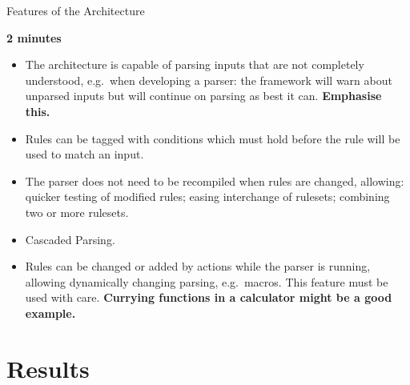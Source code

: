 \documentclass{beamer}
\newcommand{\timingnote}[1]{%
    \textbf{#1}%
}
\begin{document}
\begin{frame}{Features of the Architecture}

    \timingnote{2 minutes}

    \begin{itemize}

        \item The architecture is capable of parsing inputs that are not
            completely understood, e.g.\ when developing a parser: the
            framework will warn about unparsed inputs but will continue on
            parsing as best it can.  \timingnote{Emphasise this.}

        \item Rules can be tagged with conditions which must hold before
            the rule will be used to match an input.

        \item The parser does not need to be recompiled when rules are
            changed, allowing: quicker testing of modified rules; easing
            interchange of rulesets; combining two or more rulesets.

        \item Cascaded Parsing.

        \item Rules can be changed or added by actions while the parser is
            running, allowing dynamically changing parsing, e.g.\ macros.
            This feature must be used with care.  \timingnote{Currying
            functions in a calculator might be a good example.}

    \end{itemize}

\end{frame}


\section{Results}
\end{document}
